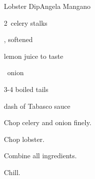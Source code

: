 \begin{recipe}{Lobster Dip}{Angela Mangano}{}

\begin{ingredients}
\item 2~celery stalks
\item {} , softened
\item lemon juice to taste
\item \half~onion
\item 3-4 boiled  tails
\item dash of Tabasco sauce
\end{ingredients}

\begin{directions}
\item Chop celery and onion finely.
\item Chop lobster.
\item Combine all ingredients.
\item Chill.
\end{directions}

\end{recipe}
